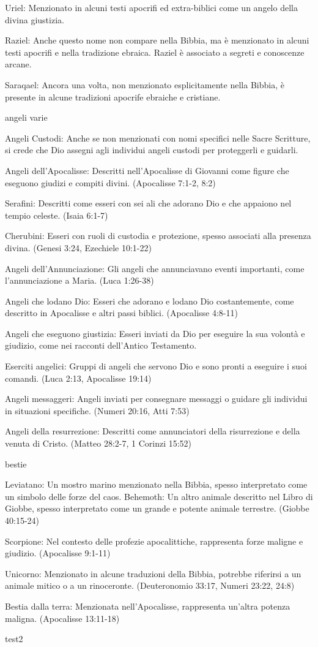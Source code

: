 \documentclass[12pt,a4paper,twoside,openany]{book}
\begin{document}
Uriel: Menzionato in alcuni testi apocrifi ed extra-biblici come un angelo della divina giustizia.

Raziel: Anche questo nome non compare nella Bibbia, ma è menzionato in alcuni testi apocrifi e nella tradizione ebraica. Raziel è associato a segreti e conoscenze arcane.


Saraqael: Ancora una volta, non menzionato esplicitamente nella Bibbia, è presente in alcune tradizioni apocrife ebraiche e cristiane.

angeli varie

Angeli Custodi: Anche se non menzionati con nomi specifici nelle Sacre Scritture, si crede che Dio assegni agli individui angeli custodi per proteggerli e guidarli.

Angeli dell'Apocalisse: Descritti nell'Apocalisse di Giovanni come figure che eseguono giudizi e compiti divini. (Apocalisse 7:1-2, 8:2)

Serafini: Descritti come esseri con sei ali che adorano Dio e che appaiono nel tempio celeste. (Isaia 6:1-7)

Cherubini: Esseri con ruoli di custodia e protezione, spesso associati alla presenza divina. (Genesi 3:24, Ezechiele 10:1-22)

Angeli dell'Annunciazione: Gli angeli che annunciavano eventi importanti, come l'annunciazione a Maria. (Luca 1:26-38)

Angeli che lodano Dio: Esseri che adorano e lodano Dio costantemente, come descritto in Apocalisse e altri passi biblici. (Apocalisse 4:8-11)

Angeli che eseguono giustizia: Esseri inviati da Dio per eseguire la sua volontà e giudizio, come nei racconti dell'Antico Testamento.

Eserciti angelici: Gruppi di angeli che servono Dio e sono pronti a eseguire i suoi comandi. (Luca 2:13, Apocalisse 19:14)

Angeli messaggeri: Angeli inviati per consegnare messaggi o guidare gli individui in situazioni specifiche. (Numeri 20:16, Atti 7:53)

Angeli della resurrezione: Descritti come annunciatori della risurrezione e della venuta di Cristo. (Matteo 28:2-7, 1 Corinzi 15:52)

bestie


Leviatano: Un mostro marino menzionato nella Bibbia, spesso interpretato come un simbolo delle forze del caos.
Behemoth: Un altro animale descritto nel Libro di Giobbe, spesso interpretato come un grande e potente animale terrestre. (Giobbe 40:15-24)

Scorpione: Nel contesto delle profezie apocalittiche, rappresenta forze maligne e giudizio. (Apocalisse 9:1-11)

Unicorno: Menzionato in alcune traduzioni della Bibbia, potrebbe riferirsi a un animale mitico o a un rinoceronte. (Deuteronomio 33:17, Numeri 23:22, 24:8)

Bestia dalla terra: Menzionata nell'Apocalisse, rappresenta un'altra potenza maligna. (Apocalisse 13:11-18)

test2

{\small \printindex}
\end{document}
